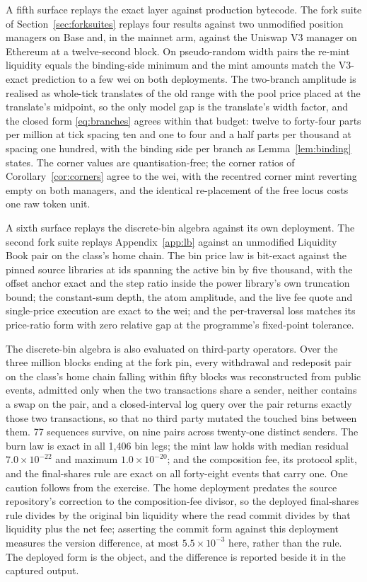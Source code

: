 \documentclass[11pt,a4paper]{article}
\theoremstyle{definition}
\theoremstyle{plain}
\theoremstyle{remark}
\begin{document}
A fifth surface replays the exact layer against production bytecode. The fork suite of Section~\ref{sec:forksuites} replays four results against two unmodified position managers on 
Base and, in the mainnet arm, against the Uniswap V3 manager on Ethereum at a twelve-second block. On pseudo-random width pairs the re-mint liquidity equals the binding-side minimum 
and the mint amounts match the V3-exact prediction to a few wei on both deployments. The two-branch amplitude is realised as whole-tick translates of the old range with the pool price 
placed at the translate's midpoint, so the only model gap is the translate's width factor, and the closed form \eqref{eq:branches} agrees within that budget: twelve to forty-four parts 
per million at tick spacing ten and one to four and a half parts per thousand at spacing one hundred, with the binding side per branch as Lemma~\ref{lem:binding} states. The corner values 
are quantisation-free; the corner ratios of Corollary~\ref{cor:corners} agree to the wei, with the recentred corner mint reverting empty on both managers, and the identical re-placement of 
the free locus costs one raw token unit.

A sixth surface replays the discrete-bin algebra against its own deployment. The second fork suite replays Appendix~\ref{app:lb} against an unmodified Liquidity Book pair on the class's home 
chain. The bin price law is bit-exact against the pinned source libraries at ids spanning the active bin by five thousand, with the offset anchor exact and the step ratio inside the power 
library's own truncation bound; the constant-sum depth, the atom amplitude, and the live fee quote and single-price execution are exact to the wei; and the per-traversal loss matches its 
price-ratio form with zero relative gap at the programme's fixed-point tolerance.

The discrete-bin algebra is also evaluated on third-party operators. Over the three million blocks ending at the fork pin, every withdrawal and redeposit pair on the class's home chain 
falling within fifty blocks was reconstructed from public events, admitted only when the two transactions share a sender, neither contains a swap on the pair, and a closed-interval log 
query over the pair returns exactly those two transactions, so that no third party mutated the touched bins between them. 77 sequences survive, on nine pairs across twenty-one distinct 
senders. The burn law is exact in all 1{,}406 bin legs; the mint law holds with median residual $7.0 \times 10^{-22}$ and maximum $1.0 \times 10^{-20}$; and the composition fee, its 
protocol split, and the final-shares rule are exact on all forty-eight events that carry one. One caution follows from the exercise. The home deployment predates the source repository's 
correction to the composition-fee divisor, so the deployed final-shares rule divides by the original bin liquidity where the read commit divides by that liquidity plus the net fee; 
asserting the commit form against this deployment measures the version difference, at most $5.5 \times 10^{-3}$ here, rather than the rule. The deployed form is the object, and the difference 
is reported beside it in the captured output.
\end{document}
